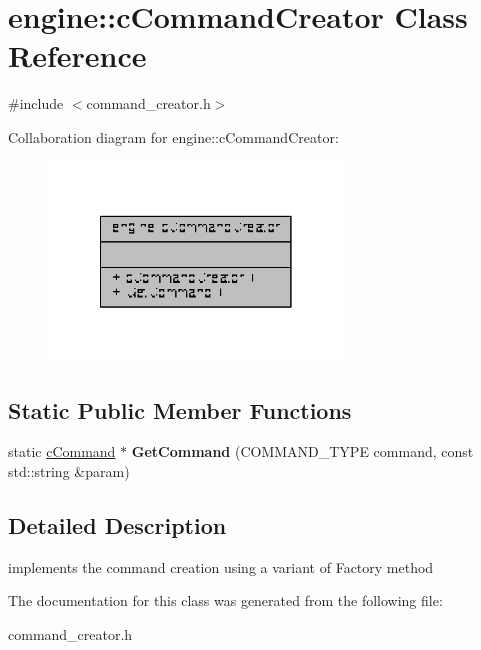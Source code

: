 \hypertarget{classengine_1_1cCommandCreator}{\section{engine\-:\-:c\-Command\-Creator Class Reference}
\label{classengine_1_1cCommandCreator}
}


{\ttfamily \#include $<$command\-\_\-creator.\-h$>$}



Collaboration diagram for engine\-:\-:c\-Command\-Creator\-:
\nopagebreak
\begin{figure}[H]
\begin{center}
\leavevmode
\includegraphics[width=222pt]{classengine_1_1cCommandCreator__coll__graph}
\end{center}
\end{figure}
\subsection*{Static Public Member Functions}
\begin{DoxyCompactItemize}
\item 
\hypertarget{classengine_1_1cCommandCreator_afced57cc0c6330127f73929878031911}{static \hyperlink{classengine_1_1cCommand}{c\-Command} $\ast$ {\bfseries Get\-Command} (C\-O\-M\-M\-A\-N\-D\-\_\-\-T\-Y\-P\-E command, const std\-::string \&param)}\label{classengine_1_1cCommandCreator_afced57cc0c6330127f73929878031911}

\end{DoxyCompactItemize}


\subsection{Detailed Description}
implements the command creation using a variant of Factory method 

The documentation for this class was generated from the following file\-:\begin{DoxyCompactItemize}
\item 
command\-\_\-creator.\-h\end{DoxyCompactItemize}
